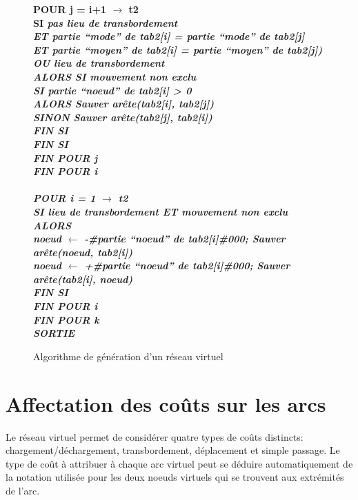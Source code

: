 \begin{center}
\begin{figure}[htbp]
{\begin{minipage}{20cm}
\begin{tabbing}
\> \> \bf {POUR} j = i+1 $\rightarrow$ t2\\
\> \> \> \bf{SI} \it{pas lieu de transbordement}\\
\> \> \> \> \bf{ET} \it{partie ``mode'' de tab2[i] = partie ``mode'' de tab2[j]}\\
\> \> \> \> \bf{ET} \it{partie ``moyen'' de tab2[i] = partie ``moyen'' de tab2[j])}\\
\> \> \> \bf{OU} \it{lieu de transbordement}\\
\> \> \> \> \> \bf{ALORS SI} \it{mouvement non exclu}\\
\> \> \> \> \> \> \bf{SI} \it{partie ``noeud'' de tab2[i] > 0}\\
\> \> \> \> \> \> \> \bf{ALORS} {Sauver arête(tab2[i], tab2[j])}\\
\> \> \> \> \> \> \> \bf{SINON} {Sauver arête(tab2[j], tab2[i])}\\
\> \> \> \> \> \> \bf{FIN SI}\\
\> \> \> \bf{FIN SI}\\
\> \> \bf{FIN POUR} j\\
\> \bf {FIN POUR} i\\
\\
\> \bf{POUR} i = 1 $\rightarrow$ t2\\
\> \> \bf{SI} \it{lieu de transbordement} \bf{ET} \it{mouvement non exclu} \bf{ALORS}\\
\> \> \> noeud $\leftarrow$ -\#\it{partie ``noeud'' de tab2[i]\#000}; \it{Sauver arête(noeud, tab2[i])}\\
\> \> \> noeud $\leftarrow$ +\#\it{partie ``noeud'' de tab2[i]\#000}; \it{Sauver arête(tab2[i], noeud)}\\
\> \> \bf{FIN SI}\\
\> \bf{FIN POUR} i\\
\bf {FIN POUR} k\\
\bf {SORTIE}
\end{tabbing}
\end{minipage}
}
\caption{\label{algo4} Algorithme de g\'en\'eration d'un r\'eseau virtuel}
\end{figure}
\end{center}



\section{Affectation des co\^uts sur les arcs}


Le réseau virtuel permet de considérer quatre types de coûts distincts:
charge\-ment/\-déchargement, transbordement, déplacement et simple passage. Le
type de coût à attribuer à chaque arc virtuel peut se déduire automatiquement de
la notation utilisée pour les deux noeuds virtuels qui se trouvent aux
extrémités de l'arc.

